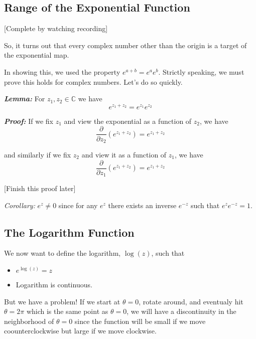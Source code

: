\documentclass{article}
\newcommand{\C}{\mathbb{C}}
\begin{document}
\subsection{Range of the Exponential Function}

[Complete by watching recording]

So, it turns out that every complex number other than the origin is a target of the exponential map.

\vskip 0.5cm
In showing this, we used the property $e^{a+b} = e^a e^b$. Strictly speaking, we must prove this holds for complex numbers. Let's do so quickly.

\vskip 0.5cm
\begin{dottedbox}
  \textbf{\emph{Lemma:}} For $z_1, z_2 \in \C$ we have 
  \[ e^{z_1 + z_2} = e^{z_1} e^{z_2} \] 
\end{dottedbox}

\vskip 0.5cm
\textbf{\emph{Proof:}}
If we fix $z_1$ and view the exponential as a function of $z_2$, we have 
\[ \frac{\partial}{\partial z_2}\left(e^{z_1 + z_2}\right) = e^{z_1 + z_2} \]

and similarly if we fix $z_2$ and view it as a function of $z_1$, we have
\[ \frac{\partial}{\partial z_1}\left(e^{z_1 + z_2}\right) = e^{z_1 + z_2} \]

[Finish this proof later]

\vskip 0.5cm
\begin{dottedbox}
  \emph{Corollary:} $e^z \neq 0$ since for any $e^z$ there exists an inverse $e^{-z}$ such that $e^{z} e^{-z} = 1$.
\end{dottedbox}

\vskip 1cm
\subsection{The Logarithm Function}
We now want to define the logarithm, $\log(z)$, such that 
\begin{itemize}
  \item $e^{\log(z)} = z $
  \item Logarithm is continuous.
\end{itemize}


But we have a problem! If we start at $\theta = 0$, rotate around, and eventualy hit $\theta = 2\pi$ which is the same point as $\theta = 0$, we will have a discontinuity in the neighborhood of $\theta = 0$ since the function will be small if we move coounterclockwise but large if we move clockwise.
\end{document}
